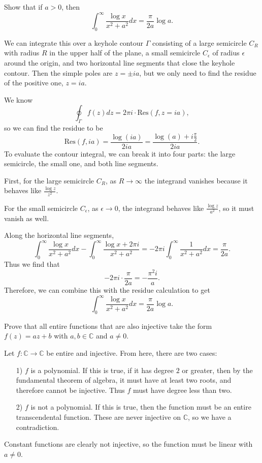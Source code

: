 \documentclass[12pt]{article}
\begin{document}

\begin{statement}[10]
  Show that if $a > 0$, then 
  $$ \int^{\infty}_0 \frac{\log x}{x^2+a^2}dx = \frac{\pi}{2a} \log a. $$
\end{statement}
\begin{newproof}
    We can integrate this over a keyhole contour $\Gamma$ consisting of a large semicircle $C_R$ with radius $R$ in the upper half of the plane, a small semicircle $C_{\epsilon}$ of radius $\epsilon$ around the origin, and two horizontal line segments that close the keyhole contour. Then the simple poles are $z = \pm ia$, but we only need to find the residue of the positive one, $z=ia$. 
    \par We know 
    $$ \oint_{\Gamma} f(z)dz = 2\pi i \cdot \text{Res}(f, z=ia), $$
    so we can find the residue to be 
    $$ \text{Res}(f,ia)=\frac{\log(ia)}{2ia} = \frac{\log(a) + i \frac{\pi}{2}}{2ia}.$$
    To evaluate the contour integral, we can break it into four parts: the large semicircle, the small one, and both line segments. 
    \par First, for the large semicircle $C_R$, as $R \to \infty$ the integrand vanishes because it behaves like $\frac{\log z}{z^2}$.
    \par For the small semicircle $C_{\epsilon}$, as $\epsilon \to 0$, the integrand behaves like $\frac{\log z}{a^2}$, so it must vanish as well. 
    \par Along the horizontal line segments, 
    $$ \int^{\infty}_0 \frac{\log x}{x^2 + a^2}dx - \int^{\infty}_0 \frac{\log x + 2\pi i}{x^2 + a^2} = -2\pi i \int^{\infty}_{0} \frac{1}{x^2+a^2}dx=\frac{\pi}{2a}.$$
    Thus we find that 
    $$ -2\pi i \cdot \frac{\pi}{2a} = - \frac{\pi^2 i }{a}.$$
    Therefore, we can combine this with the residue calculation to get 
    $$ \int^{\infty}_0 \frac{ \log x}{x^2 + a^2} dx = \frac{\pi}{2a} \log a.$$
\end{newproof}


\begin{statement}[14]
  Prove that all entire functions that are also injective take the form $f(z)=az+b$ with 
  $a,b \in \mathbb{C}$ and $a \neq 0$. 
\end{statement}
\begin{newproof}
    Let $f: \mathbb{C} \to \mathbb{C}$ be entire and injective. From here, there are two cases:
    \begin{itemize}
        \item[1)] $f$ is a polynomial. If this is true, if it has degree $2$ or greater, then by the fundamental theorem of algebra, it must have at least two roots, and therefore cannot be injective. Thus $f$ must have degree less than two.
        \item[2)] $f$ is not a polynomial. If this is true, then the function must be an entire transcendental function. These are never injective on $\mathbb{C}$, so we have a contradiction. 
    \end{itemize}
    Constant functions are clearly not injective, so the function must be linear with $a \neq 0$.
\end{newproof}
\end{document}
